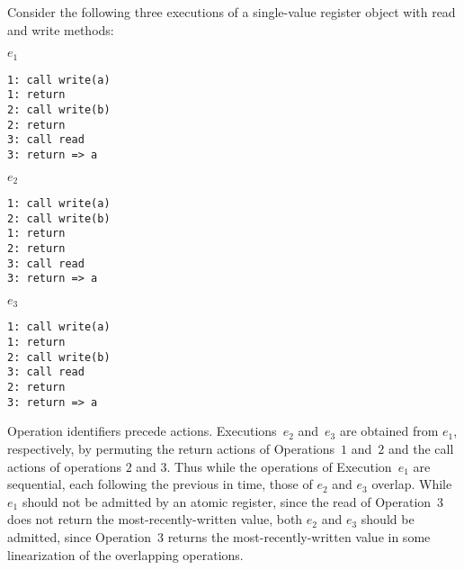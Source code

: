 \begin{example}
  \label{ex:executions}

  Consider the following three executions of a single-value register object
  with read and write methods:
  \begin{center}
    \hfill
    \begin{minipage}{0.3\linewidth}
      $e_1$
      \begin{verbatim}
1: call write(a)
1: return
2: call write(b)
2: return
3: call read
3: return => a
      \end{verbatim}
    \end{minipage}
    \hfill
    \begin{minipage}{0.3\linewidth}
      $e_2$
      \begin{verbatim}
1: call write(a)
2: call write(b)
1: return
2: return
3: call read
3: return => a
      \end{verbatim}
    \end{minipage}
    \hfill
    \begin{minipage}{0.3\linewidth}
      $e_3$
      \begin{verbatim}
1: call write(a)
1: return
2: call write(b)
3: call read
2: return
3: return => a
      \end{verbatim}
    \end{minipage}
    \hfill
  \end{center}
  Operation identifiers precede actions. Executions~$e_2$ and~$e_3$ are obtained
  from $e_1$, respectively, by permuting the return actions of Operations~$1$
  and~$2$ and the call actions of operations $2$ and $3$. Thus while the
  operations of Execution~$e_1$ are sequential, each following the previous in
  time, those of $e_2$ and $e_3$ overlap. While $e_1$ should not be admitted by
  an atomic register, since the read of Operation~$3$ does not return the
  most-recently-written value, both $e_2$ and $e_3$ should be admitted, since
  Operation~$3$ returns the most-recently-written value in some linearization of
  the overlapping operations.

\end{example}

